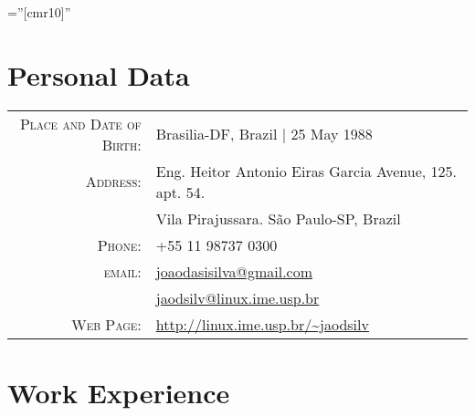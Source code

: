 \documentclass[a4paper,10pt]{article} %
\begin{document}
\pagestyle{empty} %

\font\fb=''[cmr10]'' %


\par{\bigskip\par} %

\section{Personal Data}

\begin{tabular}{rl}
\textsc{Place and Date of Birth:} & Brasilia-DF, Brazil | 25 May 1988 \\
\textsc{Address:} & Eng. Heitor Antonio Eiras Garcia Avenue, 125. apt. 54.\\& Vila Pirajussara. São Paulo-SP, Brazil \\
\textsc{Phone:} & +55 11 98737 0300\\
\textsc{email:} & \href{mailto:joaodasisilva@gmail.com}{joaodasisilva@gmail.com}\\
& \href{mailto:jaodsilv@linux.ime.usp.br}{jaodsilv@linux.ime.usp.br}\\
\textsc{Web Page:} & \href{http://linux.ime.usp.br/~jaodsilv}{http://linux.ime.usp.br/\textasciitilde{}jaodsilv}\\
\end{tabular}



\section{Work Experience}
\end{document}

